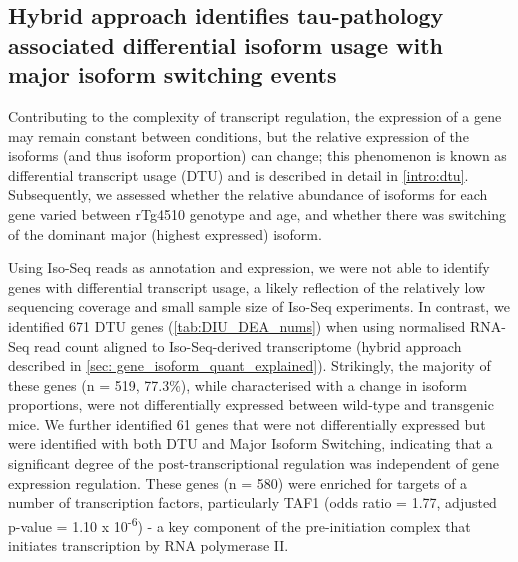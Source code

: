 \clearpage
\subsection{Hybrid approach identifies tau-pathology associated differential isoform usage with major isoform switching events}
Contributing to the complexity of transcript regulation, the expression of a gene may remain constant between conditions, but the relative expression of the isoforms (and thus isoform proportion) can change; this phenomenon is known as differential transcript usage (DTU) and is described in detail in \cref{intro:dtu}. Subsequently, we assessed whether the relative abundance of isoforms for each gene varied between rTg4510 genotype and age, and whether there was switching of the dominant major (highest expressed) isoform. 

Using Iso-Seq reads as annotation and expression, we were not able to identify genes with differential transcript usage, a likely reflection of the relatively low sequencing coverage and small sample size of Iso-Seq experiments. In contrast, we identified 671 DTU genes (\cref{tab:DIU_DEA_nums}) when using normalised RNA-Seq read count aligned to Iso-Seq-derived transcriptome (hybrid approach described in \cref{sec: gene_isoform_quant_explained}). Strikingly, the majority of these genes (n = 519, 77.3\%), while characterised with a change in isoform proportions, were not differentially expressed between wild-type and transgenic mice. We further identified 61 genes that were not differentially expressed but were identified with both DTU and Major Isoform Switching, indicating that a significant degree of the post-transcriptional regulation was independent of gene expression regulation. These genes (n = 580) were enriched for targets of a number of transcription factors, particularly TAF1 (odds ratio = 1.77, adjusted p-value = 1.10 x 10\textsuperscript{-6}) - a key component of the pre-initiation complex that initiates transcription by RNA polymerase II\cite{Bieniossek2013}. 

